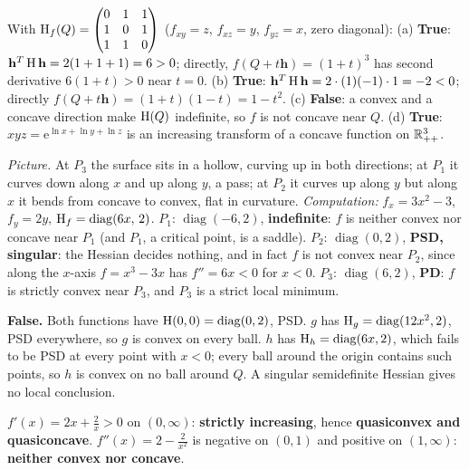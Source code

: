 \begin{solutions}
  \item With $\operatorname{H}_f(Q)=\begin{pmatrix}0&1&1\\1&0&1\\1&1&0\end{pmatrix}$
        ($f_{xy}=z$, $f_{xz}=y$, $f_{yz}=x$, zero diagonal):
        (a) \textbf{True}: $\mathbf{h}^{T}\operatorname{H}\mathbf{h}
        =2(1+1+1)=6>0$; directly, $f(Q+t\mathbf{h})=(1+t)^{3}$ has second
        derivative $6(1+t)>0$ near $t=0$.
        (b) \textbf{True}: $\mathbf{h}^{T}\operatorname{H}\mathbf{h}=2\cdot(1)(-1)\cdot1
        =-2<0$; directly $f(Q+t\mathbf{h})=(1+t)(1-t)=1-t^{2}$.
        (c) \textbf{False}: a convex and a concave direction make
        $\operatorname{H}(Q)$ indefinite, so $f$ is not concave near $Q$.
        (d) \textbf{True}: $xyz=\mathrm{e}^{\ln x+\ln y+\ln z}$ is an
        increasing transform of a concave function on $\mathbb{R}^{3}_{++}$.

  \item \emph{Picture.} At $P_3$ the surface sits in a hollow, curving up
        in both directions; at $P_1$ it curves down along $x$ and up along
        $y$, a pass; at $P_2$ it curves up along $y$ but along $x$ it bends
        from concave to convex, flat in curvature. \emph{Computation:}
        $f_x=3x^{2}-3$, $f_y=2y$,
        $\operatorname{H}_f=\operatorname{diag}(6x,\,2)$.
        $P_1$: $\operatorname{diag}(-6,2)$, \textbf{indefinite}: $f$ is
        neither convex nor concave near $P_1$ (and $P_1$, a critical point,
        is a saddle). $P_2$: $\operatorname{diag}(0,2)$, \textbf{PSD,
        singular}: the Hessian decides nothing, and in fact $f$ is not
        convex near $P_2$, since along the $x$-axis $f=x^{3}-3x$ has
        $f''=6x<0$ for $x<0$. $P_3$: $\operatorname{diag}(6,2)$,
        \textbf{PD}: $f$ is strictly convex near $P_3$, and $P_3$ is a
        strict local minimum.

  \item \textbf{False.} Both functions have
        $\operatorname{H}(0,0)=\operatorname{diag}(0,2)$, PSD. $g$ has
        $\operatorname{H}_g=\operatorname{diag}(12x^{2},2)$, PSD everywhere, so $g$ is
        convex on every ball. $h$ has $\operatorname{H}_h=\operatorname{diag}(6x,2)$,
        which fails to be PSD at every point with $x<0$; every ball around
        the origin contains such points, so $h$ is convex on no ball around
        $Q$. A singular semidefinite Hessian gives no local conclusion.

  \item $f'(x)=2x+\tfrac2x>0$ on $(0,\infty)$: \textbf{strictly
        increasing}, hence \textbf{quasiconvex and quasiconcave}.
        $f''(x)=2-\tfrac{2}{x^{2}}$ is negative on $(0,1)$ and positive on
        $(1,\infty)$: \textbf{neither convex nor concave}.


\end{solutions}
